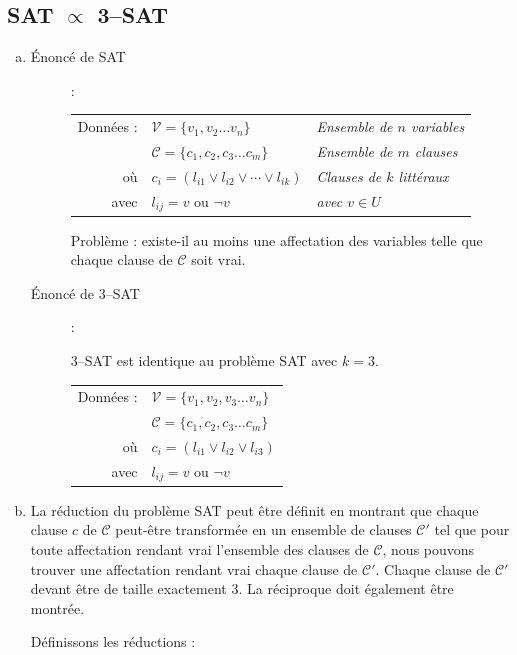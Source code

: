 \subsection{SAT $\propto$ 3--SAT}
\begin{enumerate}[(a)]
\item \begin{description}
\item[Énoncé de SAT] : \\
\begin{tabular}{r l l}
Données : & $ \mathcal{V} = \lbrace v_1, v_2 \ldots v_n \rbrace $ & \emph{Ensemble de $n$ variables}\\
& $ \mathcal{C} = \lbrace c_1, c_2, c_3 \ldots c_m \rbrace $ & \emph{Ensemble de $m$ clauses}\\
où & $ c_i = ( l_{i1} \vee l_{i2} \vee \cdots \vee l_{ik} ) $ & \emph{Clauses de $k$ littéraux}\\
avec & $ l_{ij} = v$ ou $ \neg v $ & \emph{avec $v \in U$} \\
\end{tabular}

Problème : existe-il au moins une affectation des variables telle que chaque clause de $\mathcal{C}$ soit vrai.

\item [Énoncé de 3--SAT] : 

3--SAT est identique au problème SAT avec $k = 3$.\\
\begin{tabular}{r l}
Données : & $ \mathcal{V} = \lbrace v_1, v_2, v_3 \ldots v_n \rbrace $\\
& $ \mathcal{C} = \lbrace c_1, c_2, c_3 \ldots c_m \rbrace $\\
où & $ c_i = ( l_{i1} \vee l_{i2} \vee l_{i3} ) $\\
avec & $ l_{ij} = v$ ou $ \neg v$\\
\end{tabular}
\end{description}
\item La réduction du problème SAT peut être définit en montrant que chaque clause $c$ de $\mathcal{C}$ peut-être transformée en un ensemble de clauses $\mathcal{C'}$ tel que pour toute affectation rendant vrai l'ensemble des clauses de $\mathcal{C}$, nous pouvons trouver une affectation rendant vrai chaque clause de $\mathcal{C'}$. Chaque clause de $\mathcal{C'}$ devant être de taille exactement 3. La réciproque doit également être montrée.

Définissons les réductions :


\end{enumerate}
